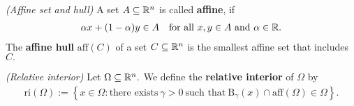 \begin{definition}
  \emph{(Affine set and hull)}
  A set 
  $A\subseteq \mathbb{R}^n$
  is called \textbf{affine}, if
  \begin{gather}
    \alpha x + (1-\alpha)y \in A
    \quad
    \text{for all}
    \ 
    x,y \in A
    \ 
    \text{and}
    \ 
    \alpha \in \R.
  \end{gather}
  The \textbf{affine hull} 
  $\mathrm{aff}(C)$
  of a set 
  $C\subseteq \mathbb{R}^n$
  is the smallest affine set that includes $C.$
\end{definition}

\begin{definition}
  \emph{(Relative interior)}
  Let 
  $\Omega\subseteq \mathbb{R}^n.$
  We define the \textbf{relative interior} of $\Omega$ by
  \begin{gather}
    \mathrm{ri}(\Omega)
    :=
    \left\{ 
      x \in \Omega 
      \colon
      \text{there exists}\ 
      \gamma > 0\ 
      \text{such that}\ 
      \mathrm{B}_\gamma(x)
      \cap
      \mathrm{aff}(\Omega)
      \in
      \Omega
    \right\}.
  \end{gather}


\end{definition}
